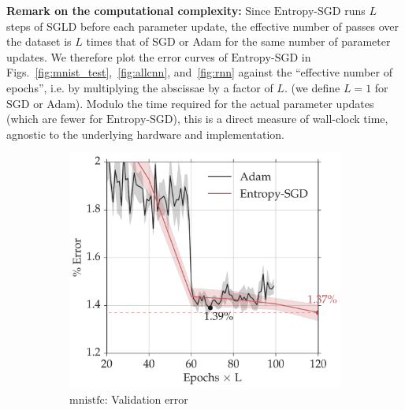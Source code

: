 \documentclass[10pt]{article}
\newcommand{\entropysgd}{\mathrm{Entropy}\textrm{-}\mathrm{SGD}}
\newcommand{\mnistfc}{\textrm{mnistfc}}
\begin{document}
\textbf{Remark on the computational complexity:} Since $\entropysgd$ runs $L$ steps of SGLD before each parameter update, the effective number of passes over the dataset is $L$ times that of SGD or Adam for the same number of parameter updates. We therefore plot the error curves of $\entropysgd$ in Figs.~\ref{fig:mnist_test},~\ref{fig:allcnn}, and~\ref{fig:rnn} against the ``effective number of epochs'', i.e. by multiplying the abscissae by a factor of $L$. (we define $L = 1$ for SGD or Adam). Modulo the time required for the actual parameter updates (which are fewer for $\entropysgd$), this is a direct measure of wall-clock time, agnostic to the underlying hardware and implementation.

\begin{figure}[htp!]
\centering
    \begin{subfigure}[t]{0.45\textwidth}
        \centering
        \includegraphics[width=1.02\textwidth]{mnistfc_valid.pdf}
        \caption{\small $\mnistfc$: Validation error}
        \label{fig:mnistfc_test}
    \end{subfigure}
    \hspace{0.2in}
    \begin{subfigure}[t]{0.45\textwidth}
        \centering

\end{subfigure}
\end{figure}
\end{document}

